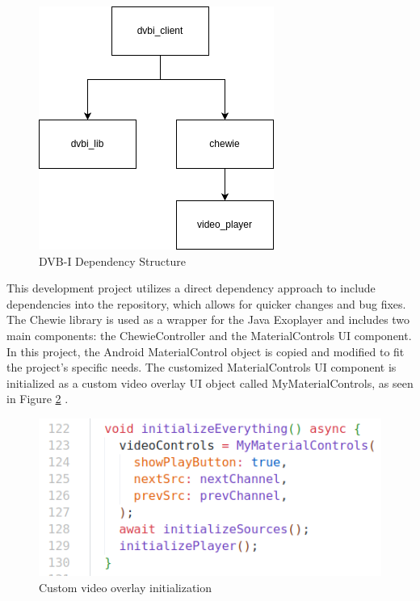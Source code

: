 \documentclass[conference]{IEEEtran}
\begin{document}
\begin{figure}[ht]
	\centerline{\includegraphics[width=\linewidth]{figures/dvbi_dir_structure}}
	\caption{DVB-I Dependency Structure}
	\label{fig:dvbi_dir_structure}
\end{figure}



This development project utilizes a direct dependency approach to include dependencies into the repository, which allows for quicker changes and bug fixes. The Chewie library is used as a wrapper for the Java Exoplayer and includes two main components: the ChewieController and the MaterialControls UI component. In this project, the Android MaterialControl object is copied and modified to fit the project's specific needs. The customized MaterialControls UI component is initialized as a custom video overlay UI object called MyMaterialControls, as seen in Figure \ref{fig:mymaterialcontrols} .


\begin{figure}[ht]
	\centerline{\includegraphics[width=\linewidth]{figures/MyMaterialControls}}
	\caption{Custom video overlay initialization}
	\label{fig:mymaterialcontrols}
\end{figure}
\end{document}

